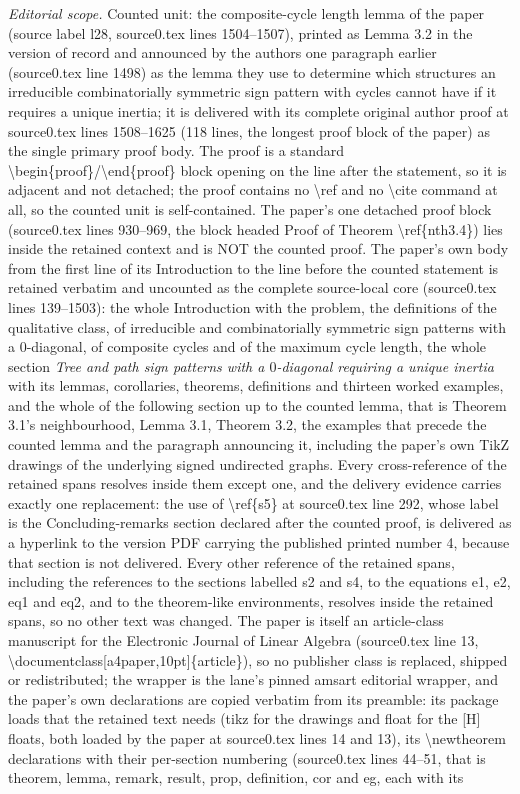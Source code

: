 \documentclass[10pt,a4paper]{amsart}
\numberwithin{equation}{section}
\begin{document}
\noindent\textit{Editorial scope.} Counted unit: the composite-cycle length lemma of the paper (source label l28, source0.tex lines 1504--1507), printed as Lemma 3.2 in the version of record and announced by the authors one paragraph earlier (source0.tex line 1498) as the lemma they use to determine which structures an irreducible combinatorially symmetric sign pattern with cycles cannot have if it requires a unique inertia; it is delivered with its complete original author proof at source0.tex lines 1508--1625 (118 lines, the longest proof block of the paper) as the single primary proof body. The proof is a standard \textbackslash{}begin\{proof\}/\textbackslash{}end\{proof\} block opening on the line after the statement, so it is adjacent and not detached; the proof contains no \textbackslash{}ref and no \textbackslash{}cite command at all, so the counted unit is self-contained. The paper's one detached proof block (source0.tex lines 930--969, the block headed Proof of Theorem \textbackslash{}ref\{nth3.4\}) lies inside the retained context and is NOT the counted proof. The paper's own body from the first line of its Introduction to the line before the counted statement is retained verbatim and uncounted as the complete source-local core (source0.tex lines 139--1503): the whole Introduction with the problem, the definitions of the qualitative class, of irreducible and combinatorially symmetric sign patterns with a $0$-diagonal, of composite cycles and of the maximum cycle length, the whole section \emph{Tree and path sign patterns with a $0$-diagonal requiring a unique inertia} with its lemmas, corollaries, theorems, definitions and thirteen worked examples, and the whole of the following section up to the counted lemma, that is Theorem 3.1's neighbourhood, Lemma 3.1, Theorem 3.2, the examples that precede the counted lemma and the paragraph announcing it, including the paper's own TikZ drawings of the underlying signed undirected graphs. Every cross-reference of the retained spans resolves inside them except one, and the delivery evidence carries exactly one replacement: the use of \textbackslash{}ref\{s5\} at source0.tex line 292, whose label is the Concluding-remarks section declared after the counted proof, is delivered as a hyperlink to the version PDF carrying the published printed number 4, because that section is not delivered. Every other reference of the retained spans, including the references to the sections labelled s2 and s4, to the equations e1, e2, eq1 and eq2, and to the theorem-like environments, resolves inside the retained spans, so no other text was changed. The paper is itself an article-class manuscript for the Electronic Journal of Linear Algebra (source0.tex line 13, \textbackslash{}documentclass[a4paper,10pt]\{article\}), so no publisher class is replaced, shipped or redistributed; the wrapper is the lane's pinned amsart editorial wrapper, and the paper's own declarations are copied verbatim from its preamble: its package loads that the retained text needs (tikz for the drawings and float for the [H] floats, both loaded by the paper at source0.tex lines 14 and 13), its \textbackslash{}newtheorem declarations with their per-section numbering (source0.tex lines 44--51, that is theorem, lemma, remark, result, prop, definition, cor and eg, each with its 
\end{document}
